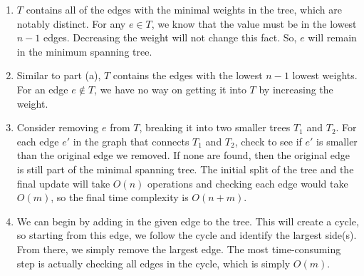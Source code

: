 \documentclass{article}
\begin{document}
\begin{solution}
\begin{enumerate}[label = (\alph*)]
    \item $T$ contains all of the edges with the minimal weights in the tree, which are notably distinct. For any $e \in T$, we know that the value must be in the lowest $n-1$ edges. Decreasing the weight will not change this fact. So, $e$ will remain in the minimum spanning tree.

    \item Similar to part (a), $T$ contains the edges with the lowest $n-1$ lowest weights. For an edge $e \not \in T$, we have no way on getting it into $T$ by increasing the weight.

    \item Consider removing $e$ from $T$, breaking it into two smaller trees $T_1$ and $T_2$. For each edge $e'$ in the graph that connects $T_1$ and $T_2$, check to see if $e'$ is smaller than the original edge we removed. If none are found, then the original edge is still part of the minimal spanning tree. The initial split of the tree and the final update will take $O(n)$ operations and checking each edge would take $O(m)$, so the final time complexity is $O(n + m)$.
    
    \item We can begin by adding in the given edge to the tree. This will create a cycle, so starting from this edge, we follow the cycle and identify the largest side(s). From there, we simply remove the largest edge. The most time-consuming step is actually checking all edges in the cycle, which is simply $O(m)$.
\end{enumerate}
\end{solution}
\end{document}
